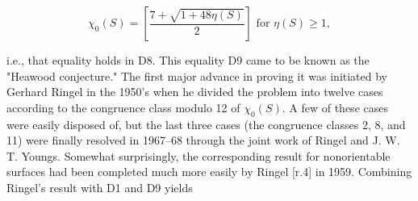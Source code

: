 $$\chi_0(S) = \left[ \frac{7 + \sqrt{1 + 48\eta(S)}}{2} \right] \text{ for } \eta(S) \geq 1,$$

i.e., that equality holds in D8. This equality D9 came to be known as the "Heawood conjecture." The first major advance in proving it was initiated by Gerhard Ringel in the 1950's when he divided the problem into twelve cases according to the congruence class modulo 12 of $\chi_0(S)$. A few of these cases were easily disposed of, but the last three cases (the congruence classes 2, 8, and 11) were finally resolved in 1967–68 through the joint work of Ringel and J. W. T. Youngs. Somewhat surprisingly, the corresponding result for nonorientable surfaces had been completed much more easily by Ringel [r.4] in 1959. Combining Ringel's result with D1 and D9 yields
